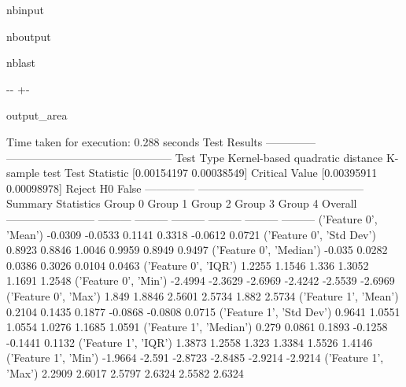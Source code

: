 \documentclass[letterpaper,10pt,english,openany,oneside]{sphinxmanual}
\begin{document}
{{{{\begin{sphinxuseclass}{nbinput}
\end{sphinxuseclass}
\begin{sphinxuseclass}{nboutput}
\begin{sphinxuseclass}{nblast}
{

\kern-\sphinxverbatimsmallskipamount\kern-\baselineskip
\kern+\FrameHeightAdjust\kern-\fboxrule
\vspace{\nbsphinxcodecellspacing}

\begin{sphinxuseclass}{output_area}
\begin{sphinxuseclass}{}


\begin{sphinxVerbatim}[commandchars=\\\{\}]
Time taken for execution: 0.288 seconds
Test Results
--------------  ---------------------------------------------
Test Type       Kernel-based quadratic distance K-sample test
Test Statistic  [0.00154197 0.00038549]
Critical Value  [0.00395911 0.00098978]
Reject H0       False
--------------  ---------------------------------------------
Summary Statistics
                            Group 0    Group 1    Group 2    Group 3    Group 4    Overall
------------------------  ---------  ---------  ---------  ---------  ---------  ---------
('Feature 0', 'Mean')       -0.0309    -0.0533     0.1141     0.3318    -0.0612     0.0721
('Feature 0', 'Std Dev')     0.8923     0.8846     1.0046     0.9959     0.8949     0.9497
('Feature 0', 'Median')     -0.035      0.0282     0.0386     0.3026     0.0104     0.0463
('Feature 0', 'IQR')         1.2255     1.1546     1.336      1.3052     1.1691     1.2548
('Feature 0', 'Min')        -2.4994    -2.3629    -2.6969    -2.4242    -2.5539    -2.6969
('Feature 0', 'Max')         1.849      1.8846     2.5601     2.5734     1.882      2.5734
('Feature 1', 'Mean')        0.2104     0.1435     0.1877    -0.0868    -0.0808     0.0715
('Feature 1', 'Std Dev')     0.9641     1.0551     1.0554     1.0276     1.1685     1.0591
('Feature 1', 'Median')      0.279      0.0861     0.1893    -0.1258    -0.1441     0.1132
('Feature 1', 'IQR')         1.3873     1.2558     1.323      1.3384     1.5526     1.4146
('Feature 1', 'Min')        -1.9664    -2.591     -2.8723    -2.8485    -2.9214    -2.9214
('Feature 1', 'Max')         2.2909     2.6017     2.5797     2.6324     2.5582     2.6324
\end{sphinxVerbatim}



\end{sphinxuseclass}
\end{sphinxuseclass}
}


\end{sphinxuseclass}
\end{sphinxuseclass}}}}}
\end{document}
